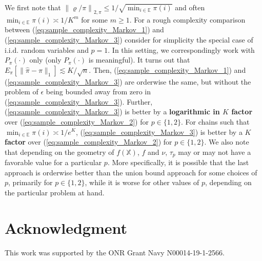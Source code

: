 \documentclass[twoside,11pt]{article}
\begin{document}
We first note that $\left\|\varrho/\pi\right\|_{2,\pi}\leq 1/\sqrt{\min_{i\in \mathbb{E}}\pi(i)}$ and often $\min_{i\in \mathbb{E}}\pi(i)\asymp 1/K^{m}$ for some $m\geq 1$. For a rough complexity comparison between (\ref{eq:sample_complexity_Markov_1}) and (\ref{eq:sample_complexity_Markov_3}) consider for simplicity the special case of i.i.d. random variables and $p=1$. In this setting, we correspondingly work with $P_{\pi}(\cdot)$ only (only $P_{\pi}(\cdot)$ is meaningful). It turns out that  $E_{\pi}[\|\hat{\pi}-\pi\|_1]\lesssim K/\sqrt{n}$. Then, (\ref{eq:sample_complexity_Markov_1}) and (\ref{eq:sample_complexity_Markov_3}) are orderwise the same, but without the problem of $\epsilon$ being bounded away from zero in (\ref{eq:sample_complexity_Markov_3}).  Further, (\ref{eq:sample_complexity_Markov_3}) is better by  a \textbf{logarithmic in $K$ factor} over (\ref{eq:sample_complexity_Markov_2}) for $p\in\{1,2\}$. For chains such that $\min_{i\in \mathbb{E}}\pi(i)\asymp 1/e^K$, (\ref{eq:sample_complexity_Markov_3}) is better by  a \textbf{$K$ factor} over (\ref{eq:sample_complexity_Markov_2}) for $p\in\{1,2\}$. We also note that depending on the geometry of $f(\mathbb{X})$, $f$ and $\nu$, $\tau_p$ may or may not have a favorable value for a particular $p$. More specifically, it is possible that the last approach is orderwise better than the union bound approach for some choices of $p$, primarily for $p\in \{1,2\}$, while it is worse for other values of $p$, depending on the particular problem at hand. 

\section*{Acknowledgment}

This work was supported by the ONR Grant Navy N00014-19-1-2566.




\end{document}
